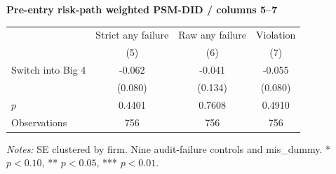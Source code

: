 \documentclass[10pt]{article}
\begin{document}
\medskip\textbf{Pre-entry risk-path weighted PSM-DID / columns 5--7}\par\smallskip
\begin{tabular*}{\textwidth}{@{\extracolsep{\fill}}lccc@{}}
\toprule
 & Strict any failure & Raw any failure & Violation \\
 & (5) & (6) & (7) \\
\midrule
Switch into Big 4 & -0.062 & -0.041 & -0.055 \\
 & (0.080) & (0.134) & (0.080) \\
$p$ & 0.4401 & 0.7608 & 0.4910 \\
Observations & 756 & 756 & 756 \\
\bottomrule\end{tabular*}\par
\medskip\fontsize{9}{11}\selectfont\textit{Notes:} SE clustered by firm. Nine audit-failure controls and mis\_dummy. * $p<0.10$, ** $p<0.05$, *** $p<0.01$.
\end{document}

